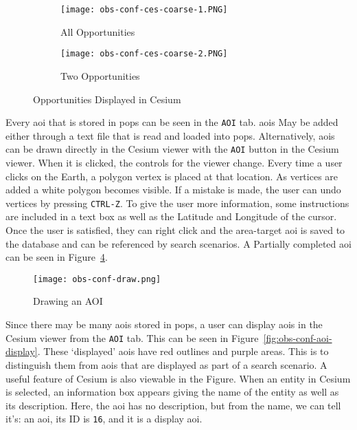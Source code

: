 \begin{figure}[h]
    \centering
    \begin{subfigure}[b]{0.49\textwidth}
	\texttt{[image: obs-conf-ces-coarse-1.PNG]} 
	\caption{All Opportunities}
	\label{fig:obs-conf-ci-1} 
    \end{subfigure}
    \hfill
    \begin{subfigure}[b]{0.49\textwidth}
	\texttt{[image: obs-conf-ces-coarse-2.PNG]} 
	\caption{Two Opportunities}
	\label{fig:obs-conf-ci-2} 
    \end{subfigure}
    \caption{Opportunities Displayed in Cesium}
    \label{fig:obs-conf-ci} 
\end{figure}

Every \gls{aoi} that is stored in \gls{pops} can be seen in the \texttt{AOI}
tab. \glspl{aoi} May be added either through a text file that is read and
loaded into \gls{pops}. Alternatively, \glspl{aoi} can be drawn directly in the
Cesium viewer with the \texttt{AOI} button in the Cesium viewer. When it is
clicked, the controls for the viewer change. Every time a user clicks on the
Earth, a polygon vertex is placed at that location. As vertices are added a
white polygon becomes visible. If a mistake is made, the user can undo vertices
by pressing \texttt{CTRL-Z}. To give the user more information, some
instructions are included in a text box as well as the Latitude and Longitude
of the cursor.  Once the user is satisfied, they can right click and the
area-target \gls{aoi} is saved to the database and can be referenced by search
scenarios. A Partially completed \gls{aoi} can be seen in
Figure~\ref{fig:obs-conf-draw}. 

\begin{figure}
    \centering
    \texttt{[image: obs-conf-draw.png]} 
    \caption{Drawing an AOI}
    \label{fig:obs-conf-draw} 
\end{figure}

Since there may be many \glspl{aoi} stored in \gls{pops}, a user can display
\glspl{aoi} in the Cesium viewer from the \texttt{AOI} tab. This can be seen in
Figure~\ref{fig:obs-conf-aoi-display}. These `displayed' \glspl{aoi} have red
outlines and purple areas. This is to distinguish them from \glspl{aoi} that
are displayed as part of a search scenario. A useful feature of Cesium is also
viewable in the Figure. When an entity in Cesium is selected, an information
box appears giving the name of the entity as well as its description. Here, the
\gls{aoi} has no description, but from the name, we can tell it's: an \gls{aoi},
its ID is \texttt{16}, and it is a display \gls{aoi}.

